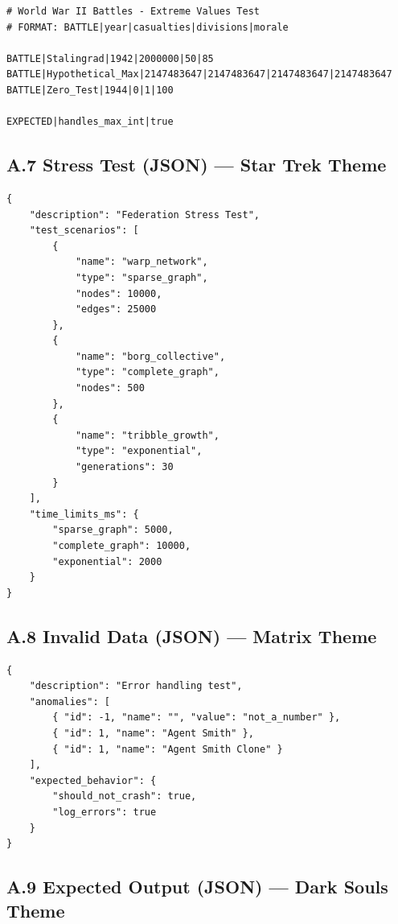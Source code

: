 \begin{lstlisting}[style=plaintext, caption={data/edge\_case\_max.txt}]
# World War II Battles - Extreme Values Test
# FORMAT: BATTLE|year|casualties|divisions|morale

BATTLE|Stalingrad|1942|2000000|50|85
BATTLE|Hypothetical_Max|2147483647|2147483647|2147483647|2147483647
BATTLE|Zero_Test|1944|0|1|100

EXPECTED|handles_max_int|true
\end{lstlisting}

\subsection*{A.7 Stress Test (JSON) --- Star Trek Theme}

\begin{lstlisting}[style=json, caption={data/test\_stress.json}]
{
    "description": "Federation Stress Test",
    "test_scenarios": [
        {
            "name": "warp_network",
            "type": "sparse_graph",
            "nodes": 10000,
            "edges": 25000
        },
        {
            "name": "borg_collective",
            "type": "complete_graph",
            "nodes": 500
        },
        {
            "name": "tribble_growth",
            "type": "exponential",
            "generations": 30
        }
    ],
    "time_limits_ms": {
        "sparse_graph": 5000,
        "complete_graph": 10000,
        "exponential": 2000
    }
}
\end{lstlisting}

\subsection*{A.8 Invalid Data (JSON) --- Matrix Theme}

\begin{lstlisting}[style=json, caption={data/test\_invalid.json}]
{
    "description": "Error handling test",
    "anomalies": [
        { "id": -1, "name": "", "value": "not_a_number" },
        { "id": 1, "name": "Agent Smith" },
        { "id": 1, "name": "Agent Smith Clone" }
    ],
    "expected_behavior": {
        "should_not_crash": true,
        "log_errors": true
    }
}
\end{lstlisting}

\subsection*{A.9 Expected Output (JSON) --- Dark Souls Theme}

